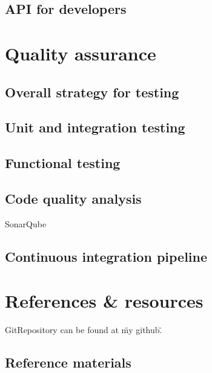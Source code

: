\documentclass[12pt]{article}
\begin{document}
\subsection{API for developers}

\section{Quality assurance}

\subsection{Overall strategy for testing}

\subsection{Unit and integration testing}

\subsection{Functional testing}

\subsection{Code quality analysis}

SonarQube

\subsection{Continuous integration pipeline}

\section{References \& resources}

GitRepository can be found at \"my github\".
\subsection{Reference materials}
\end{document}
